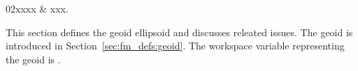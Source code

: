 %
%
 \label{sec:ppath}

%
%
\starthistory
  02xxxx & xxx.\\
\stophistory


%
%
%




\label{sec:ppath:geoids}

This section defines the geoid ellipsoid and discusses releated
issues. The geoid is introduced in Section~\ref{sec:fm_defs:geoid}.
The workspace variable representing the geoid is .


